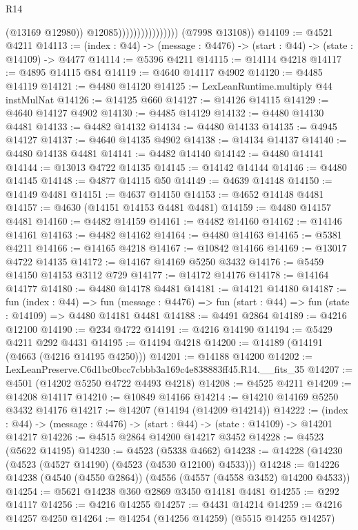 \begin{lexlean}{R14}
\begin{coremodule}
                                        (@13169 @12980))
                                      @12085))))))))))))))))
      (@7998 @13108))
@14109 := @4521 @4211
@14113 := (index : @44) -> (message : @4476) -> (start : @44) -> (state : @14109) -> @4477
@14114 := @5396 @4211
@14115 := @14114 @4218
@14117 := @4895 @14115 @84
@14119 := @4640 @14117 @4902
@14120 := @4485 @14119
@14121 := @4480 @14120
@14125 := LexLeanRuntime.multiply @44 instMulNat
@14126 := @14125 @660
@14127 := @14126 @14115
@14129 := @4640 @14127 @4902
@14130 := @4485 @14129
@14132 := @4480 @14130 @4481
@14133 := @4482 @14132
@14134 := @4480 @14133
@14135 := @4945 @14127
@14137 := @4640 @14135 @4902
@14138 := @14134 @14137
@14140 := @4480 @14138 @4481
@14141 := @4482 @14140
@14142 := @4480 @14141
@14144 := @13013 @4722 @14135
@14145 := @14142 @14144
@14146 := @4480 @14145
@14148 := @4877 @14115 @50
@14149 := @4639 @14148
@14150 := @14149 @4481
@14151 := @4637 @14150
@14153 := @4652 @14148 @4481
@14157 := @4630 (@14151 @14153 @4481 @4481)
@14159 := @4480 @14157 @4481
@14160 := @4482 @14159
@14161 := @4482 @14160
@14162 := @14146 @14161
@14163 := @4482 @14162
@14164 := @4480 @14163
@14165 := @5381 @4211
@14166 := @14165 @4218
@14167 := @10842 @14166
@14169 := @13017 @4722 @14135
@14172 := @14167 @14169 @5250 @3432
@14176 := @5459 @14150 @14153 @3112 @729
@14177 := @14172 @14176
@14178 := @14164 @14177
@14180 := @4480 @14178 @4481
@14181 := @14121 @14180
@14187 := fun (index : @44) =>
  fun (message : @4476) => fun (start : @44) => fun (state : @14109) => @4480 @14181 @4481
@14188 := @4491 @2864
@14189 := @4216 @12100
@14190 := @234 @4722
@14191 := @4216 @14190
@14194 := @5429 @4211 @292 @4431
@14195 := @14194 @4218
@14200 := @14189 (@14191 (@4663 (@4216 @14195 @4250)))
@14201 := @14188 @14200
@14202 := LexLeanPreserve.C6d1bc0bcc7cbbb3a169c4e838883ff45.R14.__fits_35
@14207 := @4501 (@14202 @5250 @4722 @4493 @4218)
@14208 := @4525 @4211
@14209 := @14208 @14117
@14210 := @10849 @14166
@14214 := @14210 @14169 @5250 @3432 @14176
@14217 := @14207 (@14194 (@14209 @14214))
@14222 := (index : @44) -> (message : @4476) -> (start : @44) -> (state : @14109) -> @14201 @14217
@14226 := @4515 @2864 @14200 @14217 @3452
@14228 := @4523 (@5622 @14195)
@14230 := @4523 (@5338 @4662)
@14238 := @14228 (@14230 (@4523 (@4527 @14190) (@4523 (@4530 @12100) @4533)))
@14248 := @14226 @14238 (@4540 (@4550 @2864)) (@4556 (@4557 (@4558 @3452) @14200 @4533))
@14254 := @5621 @14238 @360 @2869 @3450 @14181 @4481
@14255 := @292 @14117
@14256 := @4216 @14255
@14257 := @4431 @14214
@14259 := @4216 @14257 @4250
@14264 := @14254 (@14256 @14259) (@5515 @14255 @14257)

\end{coremodule}
\end{lexlean}
